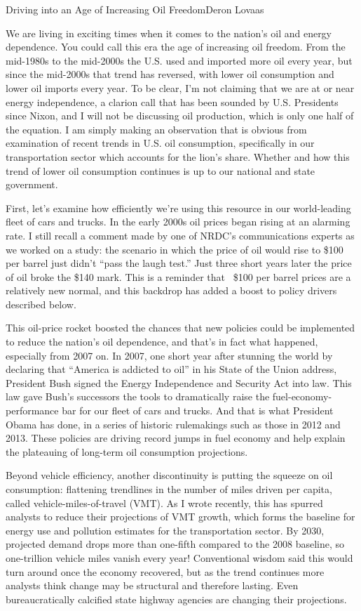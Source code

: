 \documentclass{papertex}
\begin{document}
\begin{news}{2}{Driving into an Age of Increasing Oil Freedom}{Deron Lovaas}{}{}

We are living in exciting times when it comes to the nation’s oil and energy 
dependence. You could call this era the age of increasing oil freedom. From 
the mid-1980s to the mid-2000s the U.S. used and imported more oil every year, 
but since the mid-2000s that trend has reversed, with lower oil consumption 
and lower oil imports every year. To be clear, I’m not claiming that we are 
at or near energy independence, a clarion call that has been sounded by U.S. 
Presidents since Nixon, and I will not be discussing oil production, which is 
only one half of the equation. I am simply making an observation that is 
obvious from examination of recent trends in U.S. oil consumption, 
specifically in our transportation sector which accounts for the lion’s share. 
Whether and how this trend of lower oil consumption continues is up to our 
national and state government.

First, let’s examine how efficiently we’re using this resource in our 
world-leading fleet of cars and trucks. In the early 2000s oil prices began 
rising at an alarming rate. I still recall a comment made by one of NRDC’s 
communications experts as we worked on a study: the scenario in which the 
price of oil would rise to \$100 per barrel just didn’t “pass the laugh test.” 
Just three short years later the price of oil broke the \$140 mark. This is a 
reminder that ~\$100 per barrel prices are a relatively new normal, and this 
backdrop has added a boost to policy drivers described below.

This oil-price rocket boosted the chances that new policies could be 
implemented to reduce the nation’s oil dependence, and that’s in fact what 
happened, especially from 2007 on. In 2007, one short year after stunning the 
world by declaring that “America is addicted to oil” in his State of the Union 
address, President Bush signed the Energy Independence and Security Act into 
law. This law gave Bush’s successors the tools to dramatically raise the 
fuel-economy-performance bar for our fleet of cars and trucks. And that is 
what President Obama has done, in a series of historic rulemakings such as 
those in 2012 and 2013. These policies are driving record jumps in fuel 
economy and help explain the plateauing of long-term oil consumption 
projections.

Beyond vehicle efficiency, another discontinuity is putting the squeeze on oil 
consumption: flattening trendlines in the number of miles driven per capita, 
called vehicle-miles-of-travel (VMT). As I wrote recently, this has spurred 
analysts to reduce their projections of VMT growth, which forms the baseline 
for energy use and pollution estimates for the transportation sector. By 2030, 
projected demand drops more than one-fifth compared to the 2008 baseline, so 
one-trillion vehicle miles vanish every year! Conventional wisdom said this 
would turn around once the economy recovered, but as the trend continues more 
analysts think change may be structural and therefore lasting. Even 
bureaucratically calcified state highway agencies are changing their 
projections.


\end{news}
\end{document}
